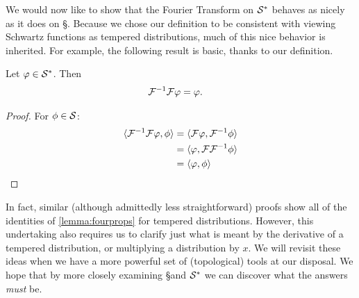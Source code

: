       We would now like to show that the Fourier Transform on $\S^*$ behaves as nicely as it does on \S.
      Because we chose our definition to be consistent with viewing Schwartz functions as tempered distributions, much of this nice behavior is inherited.
      For example, the following result is basic, thanks to our definition.
      \begin{thm}
        \label{thm:fourinv_td}
        Let $\varphi\in\S^*$.
        Then
        \begin{align*}
          \F^{-1}\F\varphi &= \varphi \text{.}
        \end{align*}
      \end{thm}
      \begin{proof}
        For $\phi\in\S$:
        \begin{align*}
          \langle\F^{-1}\F\varphi, \phi\rangle &= \langle \F\varphi, \F^{-1}\phi\rangle\\
          &= \langle\varphi, \F\F^{-1}\phi\rangle\\
          &= \langle\varphi, \phi\rangle
        \end{align*}
      \end{proof}

      In fact, similar (although admittedly less straightforward) proofs show all of the identities of \cref{lemma:fourprops} for tempered distributions.
      However, this undertaking also requires us to clarify just what is meant by the derivative of a tempered distribution, or multiplying a distribution by $x$.
      We will revisit these ideas when we have a more powerful set of (topological) tools at our disposal.
      We hope that by more closely examining \S and $\S^*$ we can discover what the answers \emph{must} be.

